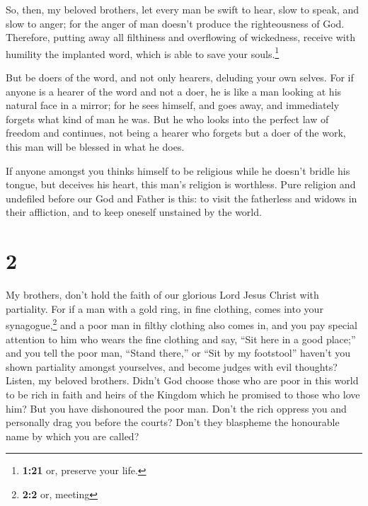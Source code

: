  So, then, my beloved brothers, let every man be swift to
hear, slow to speak, and slow to anger;  for the anger of
man doesn't produce the righteousness of God.  Therefore,
putting away all filthiness and overflowing of wickedness, receive with
humility the implanted word, which is able to save your
souls.\footnote{\textbf{1:21} or, preserve your life.}

 But be doers of the word, and not only hearers, deluding
your own selves.  For if anyone is a hearer of the word
and not a doer, he is like a man looking at his natural face in a
mirror;  for he sees himself, and goes away, and
immediately forgets what kind of man he was.  But he who
looks into the perfect law of freedom and continues, not being a hearer
who forgets but a doer of the work, this man will be blessed in what he
does.

 If anyone amongst you thinks himself to be religious
while he doesn't bridle his tongue, but deceives his heart, this man's
religion is worthless.  Pure religion and undefiled
before our God and Father is this: to visit the fatherless and widows in
their affliction, and to keep oneself unstained by the world.

\hypertarget{section-1}{%
\section{2}\label{section-1}}

 My brothers, don't hold the faith of our glorious Lord
Jesus Christ with partiality.  For if a man with a gold
ring, in fine clothing, comes into your synagogue,\footnote{\textbf{2:2}
  or, meeting} and a poor man in filthy clothing also comes in,
 and you pay special attention to him who wears the fine
clothing and say, ``Sit here in a good place;'' and you tell the poor
man, ``Stand there,'' or ``Sit by my footstool''  haven't
you shown partiality amongst yourselves, and become judges with evil
thoughts?  Listen, my beloved brothers. Didn't God choose
those who are poor in this world to be rich in faith and heirs of the
Kingdom which he promised to those who love him?  But you
have dishonoured the poor man. Don't the rich oppress you and personally
drag you before the courts?  Don't they blaspheme the
honourable name by which you are called?

